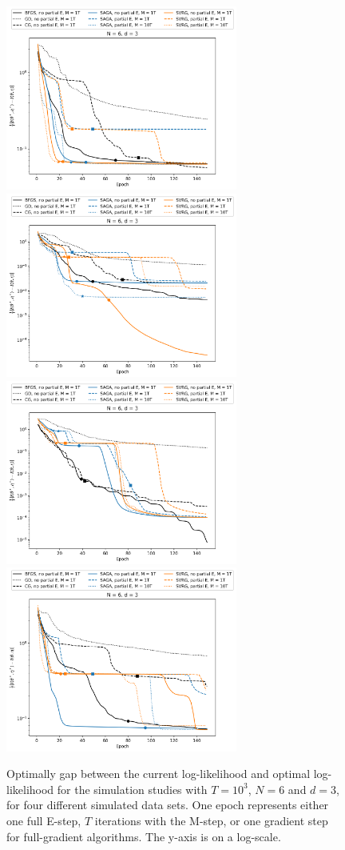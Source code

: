\documentclass{article}
\begin{document}
%
\begin{figure}
    \centering
    \includegraphics[width=3in]{../plt/log-like_v_epoch_T-1000-K-6-1-d-3-001.png}
    \includegraphics[width=3in]{../plt/log-like_v_epoch_T-1000-K-6-1-d-3-002.png}
    \\
    \includegraphics[width=3in]{../plt/log-like_v_epoch_T-1000-K-6-1-d-3-003.png}
    \includegraphics[width=3in]{../plt/log-like_v_epoch_T-1000-K-6-1-d-3-004.png}   
    \caption{Optimally gap between the current log-likelihood and optimal log-likelihood for the simulation studies with $T=10^{3}$, $N=6$ and $d=3$, for four different simulated data sets. One epoch represents either one full E-step, $T$ iterations with the M-step, or one gradient step for full-gradient algorithms. The y-axis is on a log-scale.}
\end{figure}
\end{document}
